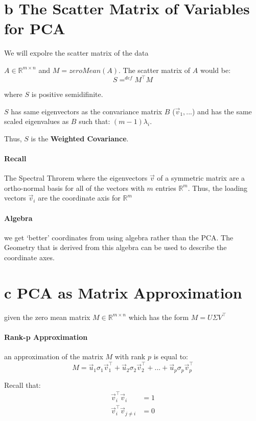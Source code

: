 \documentclass[12pt]{book}
\begin{document}
\section*{b The Scatter Matrix of Variables for PCA}
We will expolre the scatter matrix of the data 

$A \in \mathbb{R}^{m \times n}$ 
and $M = zeroMean(A)$.
The scatter matrix of $A$ would be:
\[S =^{def} M^\top M\]

where $S$ is positive semidifinite.

$S$ has same eigenvectors as the convariance matrix $B$ ($\vec v_1, ...$) and 
has the same scaled eigenvalues as $B$ such that: $(m-1)\lambda_i$.

Thus, $S$ is the \textbf{Weighted Covariance}.

\paragraph{Recall}
The Spectral Throrem where the eigenvectors $\vec v$ of a symmetric matrix 
are a ortho-normal basis for all of the vectors with $m$ entries 
$\mathbb{R}^m$. Thus, the loading vectors $\vec v_i$ are the coordinate axis for
$\mathbb{R}^m$

\paragraph{Algebra}
we get `better' coordinates from using algebra rather than the PCA.
The Geometry that is derived from this algebra can be used to describe the
coordinate axes.

\section*{c PCA as Matrix Approximation}
given the zero mean matrix $M \in \mathbb{R}^{m \times n}$ which has the 
form $M = U\Sigma V^\top$

\paragraph{Rank-p Approximation}
an approximation of the matrix $M$ with rank $p$ is equal to:
\[M = \vec u_1\sigma_1\vec v_1^\top + \vec u_2\sigma_2\vec v_2^\top + ... + \vec u_p\sigma_p\vec v_p^\top\]

Recall that:
\begin{align*}
        \vec v_i^\top \vec v_i &= 1\\
        \vec v_i^\top \vec v_{j \neq i} &= 0
\end{align*}
\end{document}
